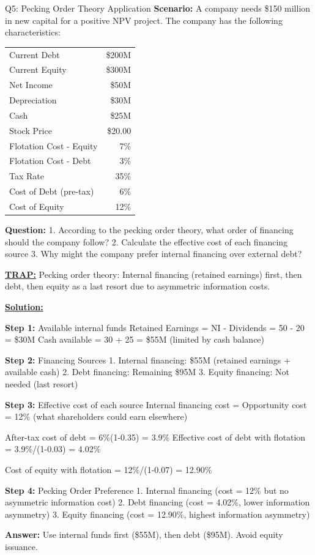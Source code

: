 \documentclass{beamer}
\renewcommand{\scriptsize}{\fontsize{6pt}{7pt}\selectfont}
\begin{document}
	\begin{frame}{Q5: Pecking Order Theory Application}
		\scriptsize
		\textbf{Scenario:} A company needs \$150 million in new capital for a positive NPV project. The company has the following characteristics:
		
		\begin{tabular}{lr}
			Current Debt & \$200M \\
			Current Equity & \$300M \\
			Net Income & \$50M \\
			Depreciation & \$30M \\
			Cash & \$25M \\
			Stock Price & \$20.00 \\
			Flotation Cost - Equity & 7\% \\
			Flotation Cost - Debt & 3\% \\
			Tax Rate & 35\% \\
			Cost of Debt (pre-tax) & 6\% \\
			Cost of Equity & 12\% \\
		\end{tabular}
		
		\textbf{Question:}
		1. According to the pecking order theory, what order of financing should the company follow?
		2. Calculate the effective cost of each financing source
		3. Why might the company prefer internal financing over external debt?
		
		\vspace{2pt}
		\underline{\textbf{TRAP:}} Pecking order theory: Internal financing (retained earnings) first, then debt, then equity as a last resort due to asymmetric information costs.
		
		\vspace{4pt}
		\underline{\textbf{Solution:}}
		
		\textbf{Step 1:} Available internal funds
		Retained Earnings = NI - Dividends = 50 - 20 = \$30M
		Cash available = 30 + 25 = \$55M (limited by cash balance)
		
		\textbf{Step 2:} Financing Sources
		1. Internal financing: \$55M (retained earnings + available cash)
		2. Debt financing: Remaining \$95M
		3. Equity financing: Not needed (last resort)
		
		\textbf{Step 3:} Effective cost of each source
		Internal financing cost = Opportunity cost = 12\% (what shareholders could earn elsewhere)
		
		After-tax cost of debt = 6\%(1-0.35) = 3.9\%
		Effective cost of debt with flotation = 3.9\%/(1-0.03) = 4.02\%
		
		Cost of equity with flotation = 12\%/(1-0.07) = 12.90\%
		
		\textbf{Step 4:} Pecking Order Preference
		1. Internal financing (cost = 12\% but no asymmetric information cost)
		2. Debt financing (cost = 4.02\%, lower information asymmetry)
		3. Equity financing (cost = 12.90\%, highest information asymmetry)
		
		\textbf{Answer:} Use internal funds first (\$55M), then debt (\$95M). Avoid equity issuance.
	\end{frame}
	
\end{document}
